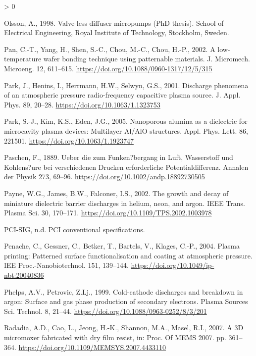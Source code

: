 \documentclass[
  11pt,
  twoside]{article}
\newlength{\cslhangindent}
\newenvironment{CSLReferences}[2] %
 {%
  \setlength{\parindent}{0pt}
  \ifodd #1 \everypar{\setlength{\hangindent}{\cslhangindent}}\ignorespaces\fi
  \ifnum #2 > 0
  \setlength{\parskip}{#2\baselineskip}
  \fi
 }%
 {}
\begin{document}
\begin{CSLReferences}{1}{0}
\leavevmode\hypertarget{ref-Olss1998}{}%
Olsson, A., 1998. Valve-less diffuser micropumps (PhD thesis). School of Electrical Engineering, Royal Institute of Technology, Stockholm, Sweden.

\leavevmode\hypertarget{ref-Pan02}{}%
Pan, C.-T., Yang, H., Shen, S.-C., Chou, M.-C., Chou, H.-P., 2002. A low-temperature wafer bonding technique using patternable materials. J. Micromech. Microeng. 12, 611--615. \url{https://doi.org/10.1088/0960-1317/12/5/315}

\leavevmode\hypertarget{ref-Park01}{}%
Park, J., Henins, I., Herrmann, H.W., Selwyn, G.S., 2001. Discharge phenomena of an atmospheric pressure radio-frequency capacitive plasma source. J. Appl. Phys. 89, 20--28. \url{https://doi.org/10.1063/1.1323753}

\leavevmode\hypertarget{ref-Park05}{}%
Park, S.-J., Kim, K.S., Eden, J.G., 2005. Nanoporous alumina as a dielectric for microcavity plasma devices: Multilayer {Al/AlO} structures. Appl. Phys. Lett. 86, 221501. \url{https://doi.org/10.1063/1.1923747}

\leavevmode\hypertarget{ref-Pasc1889}{}%
Paschen, F., 1889. {Ueber die zum Funken?bergang in Luft, Wasserstoff und Kohlens?ure bei verschiedenen Drucken erforderliche Potentialdifferenz}. Annalen der Physik 273, 69--96. \url{https://doi.org/10.1002/andp.18892730505}

\leavevmode\hypertarget{ref-Payn02}{}%
Payne, W.G., James, B.W., Falconer, I.S., 2002. The growth and decay of miniature dielectric barrier discharges in helium, neon, and argon. IEEE Trans. Plasma Sci. 30, 170--171. \url{https://doi.org/10.1109/TPS.2002.1003978}

\leavevmode\hypertarget{ref-PCI}{}%
PCI-SIG, n.d. {PCI} conventional specifications.

\leavevmode\hypertarget{ref-Pena04}{}%
Penache, C., Gessner, C., Betker, T., Bartels, V., Klages, C.-P., 2004. Plasma printing: Patterned surface functionalisation and coating at atmospheric pressure. IEE Proc.-Nanobiotechnol. 151, 139--144. \url{https://doi.org/10.1049/ip-nbt:20040836}

\leavevmode\hypertarget{ref-Phel1999}{}%
Phelps, A.V., Petrovic, Z.Lj., 1999. Cold-cathode discharges and breakdown in argon: Surface and gas phase production of secondary electrons. Plasma Sources Sci. Technol. 8, 21--44. \url{https://doi.org/10.1088/0963-0252/8/3/201}

\leavevmode\hypertarget{ref-Rada07}{}%
Radadia, A.D., Cao, L., Jeong, H.-K., Shannon, M.A., Masel, R.I., 2007. A {3D} micromoxer fabricated with dry film resist, in: Proc. Of MEMS 2007. pp. 361--364. \url{https://doi.org/10.1109/MEMSYS.2007.4433110}


\end{CSLReferences}
\end{document}
